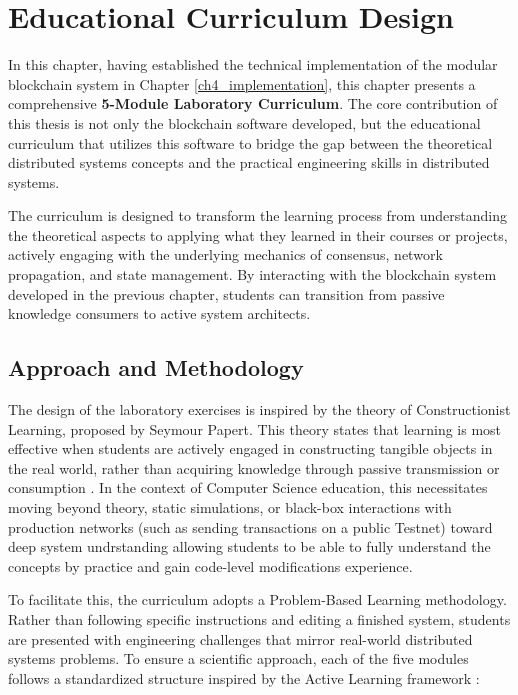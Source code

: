 \chapter{Educational Curriculum Design} \label{ch5_curriculum}


In this chapter, having established the technical implementation of the modular blockchain system in Chapter \ref{ch4_implementation}, this chapter presents a comprehensive \textbf{5-Module Laboratory Curriculum}. The core contribution of this thesis is not only the blockchain software developed, but the educational curriculum that utilizes this software to bridge the gap between the theoretical distributed systems concepts and the practical engineering skills in distributed systems.


The curriculum is designed to transform the learning process from understanding the theoretical aspects to applying what they learned in their courses or projects, actively engaging with the underlying mechanics of consensus, network propagation, and state management. By interacting with the blockchain system developed in the previous chapter, students can transition from passive knowledge consumers to active system architects.


\section{Approach and Methodology} \label{ch5_pedagogy}

The design of the laboratory exercises is inspired by the theory of Constructionist Learning, proposed by Seymour Papert. This theory states that learning is most effective when students are actively engaged in constructing tangible objects in the real world, rather than acquiring knowledge through passive transmission or consumption \cite{papert1991situating}. In the context of Computer Science education, this necessitates moving beyond theory, static simulations, or black-box interactions with production networks (such as sending transactions on a public Testnet) toward deep system undrstanding allowing students to be able to fully understand the concepts by practice and gain code-level modifications experience.

To facilitate this, the curriculum adopts a Problem-Based Learning methodology. Rather than following specific instructions and editing a finished system, students are presented with engineering challenges that mirror real-world distributed systems problems. To ensure a scientific approach, each of the five modules follows a standardized structure inspired by the Active Learning framework \cite{freeman2014active}:



